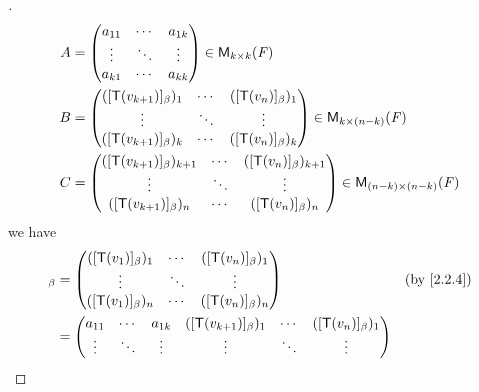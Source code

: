 \begin{proof}[]
\begin{align*}
    A & = \begin{pmatrix}
            a_{1 1} & \cdots & a_{1 k} \\
            \vdots  & \ddots & \vdots  \\
            a_{k 1} & \cdots & a_{k k}
          \end{pmatrix} \in \mathsf{M}_{{k} \times k}({\mathit{F}})                                                                    \\
    B & = \begin{pmatrix}
            ([\mathsf{T}(v_{k + 1})]_{\beta})_1 & \cdots & ([\mathsf{T}(v_n)]_{\beta})_1 \\
            \vdots                      & \ddots & \vdots                \\
            ([\mathsf{T}(v_{k + 1})]_{\beta})_k & \cdots & ([\mathsf{T}(v_n)]_{\beta})_k
          \end{pmatrix} \in \mathsf{M}_{{k} \times (n - k)}({\mathit{F}})             \\
    C & = \begin{pmatrix}
            ([\mathsf{T}(v_{k + 1})]_{\beta})_{k + 1} & \cdots & ([\mathsf{T}(v_n)]_{\beta})_{k + 1} \\
            \vdots                            & \ddots & \vdots                      \\
            ([\mathsf{T}(v_{k + 1})]_{\beta})_n       & \cdots & ([\mathsf{T}(v_n)]_{\beta})_n
          \end{pmatrix} \in \mathsf{M}_{{(n - k)} \times (n - k)}({\mathit{F}})
  \end{align*}
  we have
  \begin{align*}
    [\T]_{\beta} & = \begin{pmatrix}
                       ([\T(v_1)]_{\beta})_1 & \cdots & ([\T(v_n)]_{\beta})_1   \\
                       \vdots                & \ddots & \vdots                  \\
                       ([\T(v_1)]_{\beta})_n & \cdots & ([\T(v_n)]_{\beta})_{n}
                     \end{pmatrix}                                        &  & \text{(by \cref{2.2.4})}                                        \\
                 & = \begin{pmatrix}
                       a_{1 1} & \cdots & a_{1 k} & ([\T(v_{k + 1})]_{\beta})_1       & \cdots & ([\T(v_n)]_{\beta})_1       \\
                       \vdots  & \ddots & \vdots  & \vdots                            & \ddots & \vdots                      \\

\end{pmatrix}
\end{align*}
\end{proof}
